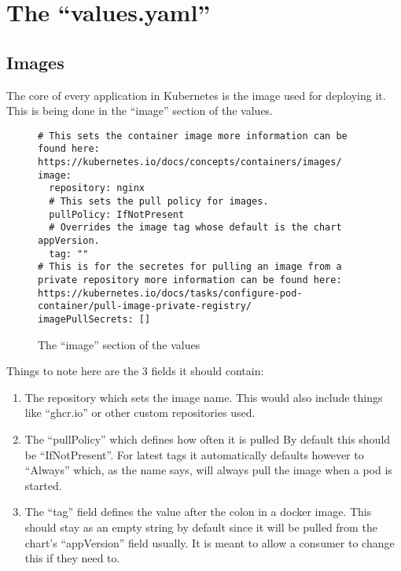 \section{The \enquote{values.yaml}}

\subsection{Images}

The core of every application in Kubernetes is the image used for deploying it.
This is being done in the \enquote{image} section of the  \gls{values}.

\begin{figure}[h]
\begin{verbatim}
# This sets the container image more information can be found here: https://kubernetes.io/docs/concepts/containers/images/
image:
  repository: nginx
  # This sets the pull policy for images.
  pullPolicy: IfNotPresent
  # Overrides the image tag whose default is the chart appVersion.
  tag: ""
# This is for the secretes for pulling an image from a private repository more information can be found here: https://kubernetes.io/docs/tasks/configure-pod-container/pull-image-private-registry/
imagePullSecrets: []
\end{verbatim}
\caption{The \enquote{image} section of the \gls{values}}\label{code:image_section}
\end{figure}

Things to note here are the 3 fields it should contain:

\begin{enumerate}
	\item{
		The repository which sets the image name.
		This would also include things like \enquote{ghcr.io} or other custom repositories used.
	}
	\item{
		The \enquote{pullPolicy} which defines how often it is pulled
		By default this should be \enquote{IfNotPresent}.
		For latest tags it automatically defaults however to \enquote{Always} which, as the name says, will always pull the image when a pod is started.
	}
	\item{
		The \enquote{tag} field defines the value after the colon in a docker image.
		This should stay as an empty string by default since it will be pulled from the chart's \enquote{appVersion} field usually.
		It is meant to allow a consumer to change this if they need to.
	}
\end{enumerate}

